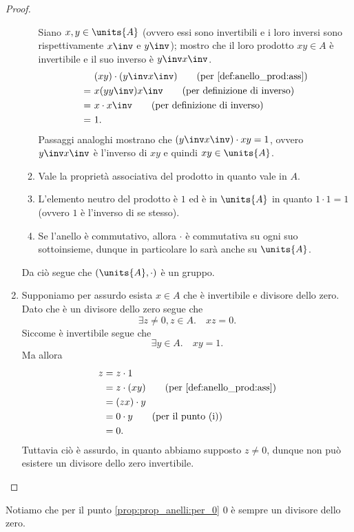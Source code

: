 \begin{proof}
\begin{enumerate}[label={(\roman*)}]
\begin{enumerate}[label={(G\arabic*)}]
            Siano $x,y \in \units{A}$ (ovvero essi sono invertibili e i loro inversi sono rispettivamente $x\inv$ e $y\inv$); mostro che il loro prodotto $xy \in A$ è invertibile e il suo inverso è $y\inv x\inv$.
            \begin{align*}
                &(xy) \cdot (y\inv x\inv) \tag{per \ref{def:anello_prod:ass}} \\
                =\ &x (y y\inv) x\inv \tag{per definizione di inverso} \\
                =\ &x \cdot x\inv \tag{per definizione di inverso}\\
                =\ &1.
            \end{align*}
            Passaggi analoghi mostrano che $(y\inv x\inv) \cdot xy = 1$, ovvero $y\inv x\inv$ è l'inverso di $xy$ e quindi $xy \in \units{A}$.
            \item Vale la proprietà associativa del prodotto in quanto vale in $A$.
            \item L'elemento neutro del prodotto è $1$ ed è in $\units{A}$ in quanto $1 \cdot 1 = 1$ (ovvero $1$ è l'inverso di se stesso).
            \item Se l'anello è commutativo, allora $\cdot$ è commutativa su ogni suo sottoinsieme, dunque in particolare lo sarà anche su $\units{A}$.
        \end{enumerate}
        Da ciò segue che $(\units{A}, \cdot)$ è un gruppo.
        \item Supponiamo per assurdo esista $x \in A$ che è invertibile e divisore dello zero.
        Dato che è un divisore dello zero segue che \[
            \exists z \neq 0, z \in A. \quad xz = 0.    
        \] Siccome è invertibile segue che \[
            \exists y \in A. \quad xy = 1.    
        \] Ma allora \begin{align*}
            z &= z\cdot 1\\
            &= z \cdot (xy) \tag{per \ref{def:anello_prod:ass}}\\
            &= (zx) \cdot y \\
            &= 0 \cdot y \tag{per il punto (i)}\\
            &= 0.
        \end{align*} Tuttavia ciò è assurdo, in quanto abbiamo supposto $z \neq 0$, dunque non può esistere un divisore dello zero invertibile.
    \end{enumerate}
\end{proof}

\begin{remark}
    Notiamo che per il punto \ref{prop:prop_anelli:per_0} $0$ è sempre un divisore dello zero.
\end{remark}

